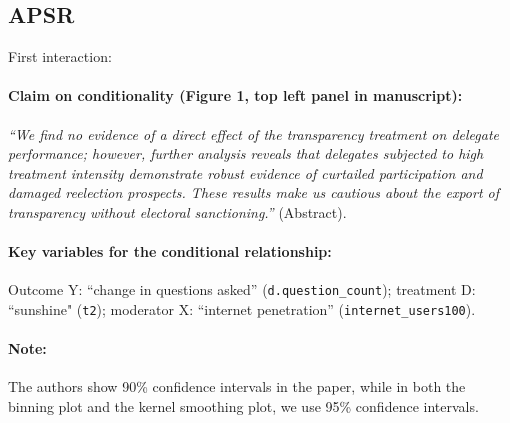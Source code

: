 \documentclass[12pt]{article}
\begin{document}
\clearpage



\subsection{\citet{malesky2012adverse} APSR} \label{malesky}

\noindent First interaction:

\paragraph{Claim on conditionality (Figure 1, top left panel in manuscript):} \emph{``We find no evidence of a direct effect of the transparency treatment on delegate performance; however,
further analysis reveals that delegates subjected to high treatment intensity demonstrate robust evidence of curtailed participation and damaged reelection prospects. These results make us cautious about the export of transparency without electoral sanctioning.''} (Abstract). 

\paragraph{Key variables for the conditional relationship:} Outcome Y:
``change in questions asked'' (\texttt{d.question\_count}); treatment D: ``sunshine" (\texttt{t2}); moderator X: ``internet penetration''
(\texttt{internet\_users100}).

\paragraph{Note:} The authors show 90\% confidence intervals in the paper, while in both the binning plot and the kernel smoothing plot, we use 95\% confidence intervals.


\newpage
\end{document}
